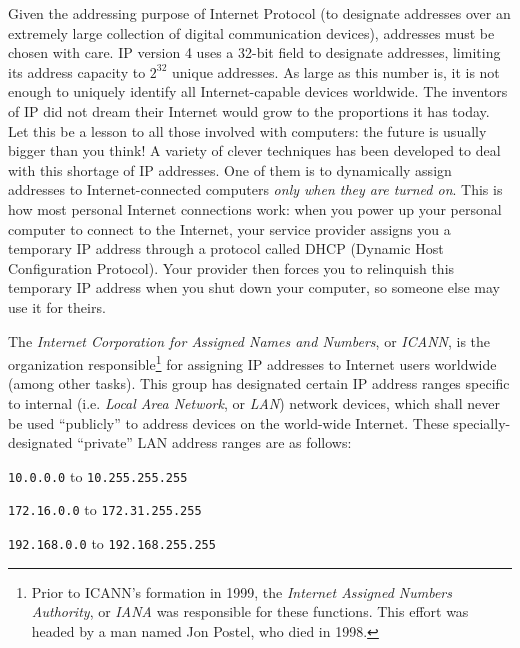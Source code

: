 Given the addressing purpose of Internet Protocol (to designate addresses over an extremely large collection of digital communication devices), addresses must be chosen with care.  IP version 4 uses a 32-bit field to designate addresses, limiting its address capacity to $2^{32}$ unique addresses.  As large as this number is, it is not enough to uniquely identify all Internet-capable devices worldwide.  The inventors of IP did not dream their Internet would grow to the proportions it has today.  Let this be a lesson to all those involved with computers: the future is usually bigger than you think!  A variety of clever techniques has been developed to deal with this shortage of IP addresses.  One of them is to dynamically assign addresses to Internet-connected computers \textit{only when they are turned on}.  This is how most personal Internet connections work: when you power up your personal computer to connect to the Internet, your service provider assigns you a temporary IP address through a protocol called DHCP (Dynamic Host Configuration Protocol).  Your provider then forces you to relinquish this temporary IP address when you shut down your computer, so someone else may use it for theirs.    

The \textit{Internet Corporation for Assigned Names and Numbers}, or \textit{ICANN}, is the organization responsible\footnote{Prior to ICANN's formation in 1999, the \textit{Internet Assigned Numbers Authority}, or \textit{IANA} was responsible for these functions.  This effort was headed by a man named Jon Postel, who died in 1998.} for assigning IP addresses to Internet users worldwide (among other tasks).  This group has designated certain IP address ranges specific to internal (i.e. \textit{Local Area Network}, or \textit{LAN}) network devices, which shall never be used ``publicly'' to address devices on the world-wide Internet.  These specially-designated ``private'' LAN address ranges are as follows:      

\vskip 10pt

\texttt{10.0.0.0} to \texttt{10.255.255.255}

\vskip 10pt

\texttt{172.16.0.0} to \texttt{172.31.255.255}

\vskip 10pt

\texttt{192.168.0.0} to \texttt{192.168.255.255}

\vskip 10pt

